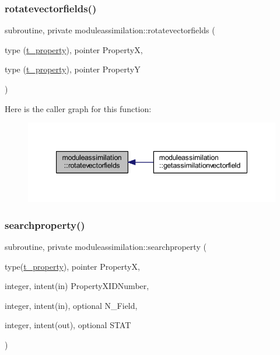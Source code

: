 \subsubsection{\texorpdfstring{rotatevectorfields()}{rotatevectorfields()}}
{\footnotesize\ttfamily subroutine, private moduleassimilation\+::rotatevectorfields (\begin{DoxyParamCaption}\item[{type (\mbox{\hyperlink{structmoduleassimilation_1_1t__property}{t\+\_\+property}}), pointer}]{PropertyX,  }\item[{type (\mbox{\hyperlink{structmoduleassimilation_1_1t__property}{t\+\_\+property}}), pointer}]{PropertyY }\end{DoxyParamCaption})\hspace{0.3cm}{\ttfamily [private]}}

Here is the caller graph for this function\+:\nopagebreak
\begin{figure}[H]
\begin{center}
\leavevmode
\includegraphics[width=347pt]{namespacemoduleassimilation_a91d65081df0418d8a1b46cb4548710f3_icgraph}
\end{center}
\end{figure}
\mbox{\label{namespacemoduleassimilation_a25c18cab5d2d7615f696e5f0ebfbada0}} 
\subsubsection{\texorpdfstring{searchproperty()}{searchproperty()}}
{\footnotesize\ttfamily subroutine, private moduleassimilation\+::searchproperty (\begin{DoxyParamCaption}\item[{type(\mbox{\hyperlink{structmoduleassimilation_1_1t__property}{t\+\_\+property}}), pointer}]{PropertyX,  }\item[{integer, intent(in)}]{Property\+X\+I\+D\+Number,  }\item[{integer, intent(in), optional}]{N\+\_\+\+Field,  }\item[{integer, intent(out), optional}]{S\+T\+AT }\end{DoxyParamCaption})\hspace{0.3cm}{\ttfamily [private]}}

